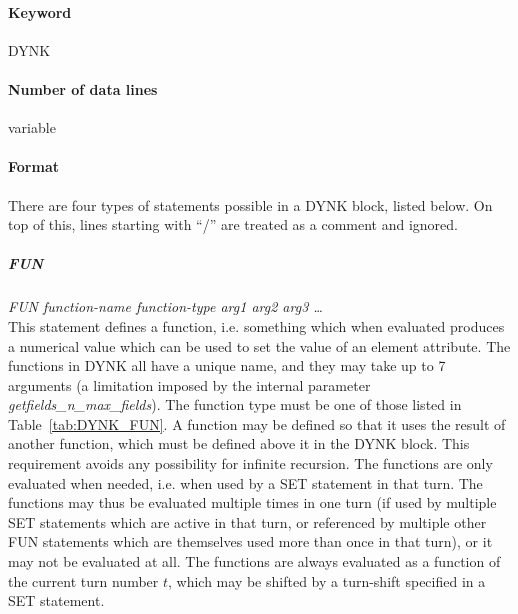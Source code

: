 \documentclass[a4paper,11pt]{report}
\begin{document}
\paragraph{Keyword} DYNK

\paragraph{Number of data lines} variable

\paragraph{Format}
There are four types of statements possible in a DYNK block, listed below.
On top of this, lines starting with ``/'' are treated as a comment and ignored.

\subparagraph{FUN} \emph{FUN function-name function-type arg1 arg2 arg3 \ldots}\\
This statement defines a function, i.e. something which when evaluated produces a numerical value which can be used to set the value of an element attribute.
The functions in DYNK all have a unique name, and they may take up to 7 arguments (a limitation imposed by the internal parameter \emph{getfields\_n\_max\_fields}).
The function type must be one of those listed in Table~\ref{tab:DYNK_FUN}.
A function may be defined so that it uses the result of another function, which must be defined above it in the DYNK block.
This requirement avoids any possibility for infinite recursion.
The functions are only evaluated when needed, i.e. when used by a SET statement in that turn.
The functions may thus be evaluated multiple times in one turn (if used by multiple SET statements which are active in that turn, or referenced by multiple other FUN statements which are themselves used more than once in that turn), or it may not be evaluated at all.
The functions are always evaluated as a function of the current turn number $t$, which may be shifted by a turn-shift specified in a SET statement.
\end{document}
